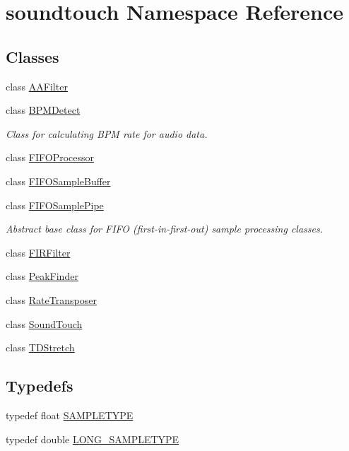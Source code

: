 \hypertarget{namespacesoundtouch}{}\section{soundtouch Namespace Reference}
\label{namespacesoundtouch}
\subsection*{Classes}
\begin{DoxyCompactItemize}
\item 
class \hyperlink{classsoundtouch_1_1_a_a_filter}{A\+A\+Filter}
\item 
class \hyperlink{classsoundtouch_1_1_b_p_m_detect}{B\+P\+M\+Detect}
\begin{DoxyCompactList}\small\item\em Class for calculating B\+PM rate for audio data. \end{DoxyCompactList}\item 
class \hyperlink{classsoundtouch_1_1_f_i_f_o_processor}{F\+I\+F\+O\+Processor}
\item 
class \hyperlink{classsoundtouch_1_1_f_i_f_o_sample_buffer}{F\+I\+F\+O\+Sample\+Buffer}
\item 
class \hyperlink{classsoundtouch_1_1_f_i_f_o_sample_pipe}{F\+I\+F\+O\+Sample\+Pipe}
\begin{DoxyCompactList}\small\item\em Abstract base class for F\+I\+FO (first-\/in-\/first-\/out) sample processing classes. \end{DoxyCompactList}\item 
class \hyperlink{classsoundtouch_1_1_f_i_r_filter}{F\+I\+R\+Filter}
\item 
class \hyperlink{classsoundtouch_1_1_peak_finder}{Peak\+Finder}
\item 
class \hyperlink{classsoundtouch_1_1_rate_transposer}{Rate\+Transposer}
\item 
class \hyperlink{classsoundtouch_1_1_sound_touch}{Sound\+Touch}
\item 
class \hyperlink{classsoundtouch_1_1_t_d_stretch}{T\+D\+Stretch}
\end{DoxyCompactItemize}
\subsection*{Typedefs}
\begin{DoxyCompactItemize}
\item 
typedef float \hyperlink{namespacesoundtouch_a97cfd29a7abb4d4b2a72f803d5b5850c}{S\+A\+M\+P\+L\+E\+T\+Y\+PE}
\item 
typedef double \hyperlink{namespacesoundtouch_a6d7c3b986241334e59ba402af1bbc127}{L\+O\+N\+G\+\_\+\+S\+A\+M\+P\+L\+E\+T\+Y\+PE}
\end{DoxyCompactItemize}


